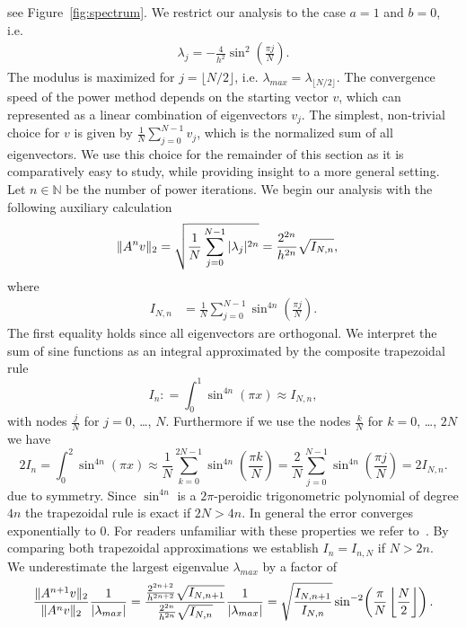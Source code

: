 \documentclass{scrartcl}
\newcommand{\defneq}{\mathrel{\mathop:}=}
\begin{document}
		see Figure~\ref{fig:spectrum}. We restrict our analysis to the case $a=1$ and $b=0$, i.e.
	\begin{align*}
		\lambda_j =-\frac{4}{h^2}\sin^2\!\left(\frac{\pi j}{N}\right).
	\end{align*}
	The modulus is maximized for $j=\lfloor N/2\rfloor$, i.e.  $\lambda_{max} = \lambda_{\lfloor N/2\rfloor}$.
	The convergence speed of the power method depends on the starting vector $v$, which can represented as a linear combination of eigenvectors $v_j$. The simplest, non-trivial choice for $v$ is given by $\frac{1}{N}\sum_{j=0}^{N-1} v_j$, which is the normalized sum of all eigenvectors. We use this choice for the remainder of this section as it is comparatively easy to study, while providing insight to a more general setting. 
	Let $n\in\mathbb{N}$ be the number of power iterations. We begin our analysis with the following auxiliary calculation
	\begin{align*}
		\lVert A^nv\rVert_2
		&= \sqrt{\frac{1}{N}\sum_{j=0}^{N-1}{\lvert\lambda_j\rvert^{2n}}}
		= \frac{2^{2n}}{h^{2n}}\sqrt{I_{N,n}} ,
	\end{align*}
	where
	\begin{align*}
		I_{N,n} &= \frac{1}{N}\sum_{j=0}^{N-1} \sin^{4n}\!\left(\frac{\pi j}{N}\right).
	\end{align*}
	The first equality holds since all eigenvectors are orthogonal. We interpret the sum of sine functions as an integral approximated by the composite trapezoidal rule
	\[
		I_n\defneq\int_{0}^{1}{\sin^{4n}\!\left(\pi x\right)} \approx I_{N,n},
	\]
	with nodes $\frac{j}{N}$ for $j=0$, \dots, $N$.
	Furthermore if we use the nodes $\frac{k}{N}$ for $k=0$, \dots, $2N$ we have
	\[
		2I_n = \int_{0}^{2}{\sin^{4n}\!\left(\pi x\right)} \approx
		\frac{1}{N}\sum_{k=0}^{2N-1}\sin^{4n}\!\left(\frac{\pi k}{N}\right)
		= \frac{2}{N}\sum_{j=0}^{N-1}\sin^{4n}\!\left(\frac{\pi j}{N}\right)
		= 2 I_{N,n}.
	\]
	due to symmetry. Since $\sin^{4n}$ is a $2\pi$-peroidic trigonometric polynomial of degree $4n$ the trapezoidal rule is exact if $2N>4n$. In general the error converges exponentially to $0$. For readers unfamiliar with these properties we refer to~\cite[Corollary 3.3]{trapezoidal}. 
	By comparing both trapezoidal approximations we establish $I_n = I_{n,N}$ if $N > 2n$.\\
	We underestimate the largest eigenvalue $\lambda_{max}$ by a factor of
	\begin{align*}
		\frac{\lVert A^{n+1}v\rVert_2}{\lVert A^nv\rVert_2}\frac{1}{\lvert\lambda_{max}\rvert}
		= \frac{\frac{2^{2n+2}}{h^{2n+2}}\sqrt{I_{N,n+1}}}{\frac{2^{2n}}{h^{2n}}\sqrt{I_{N,n}}}\frac{1}{\lvert\lambda_{max}\rvert} = \sqrt{\frac{I_{N,n+1}}{I_{N,n}}}\sin^{-2}\!\left(\frac{\pi}{N}\left\lfloor\frac{N}{2}\right\rfloor\right).
	\end{align*}
\end{document}
